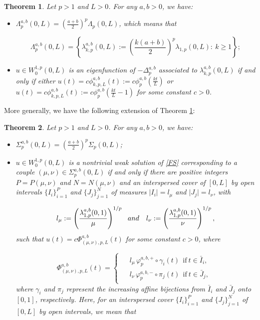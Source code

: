 \documentclass[a4paper,11pt]{article}
\newtheorem{teor}{Theorem}[section]
\begin{document}
{\begin{teor} \label{T2}
Let $p > 1$ and $L > 0$. For any $a, b > 0$, we have:

\begin{itemize}
\item[(I)] $\Lambda^{a,b}_p(0,L) = \displaystyle \left( \frac{a + b}{2} \right)^p \Lambda_p(0,L)$, which means that

\[
\Lambda^{a,b}_p(0,L) = \left\{\lambda^{a,b}_{k,p}(0,L) := \left( \frac{k(a + b)}{2} \right)^p \lambda_{1,p}(0,L):\ k \geq 1 \right\};
\]
\item[(II)] $u \in W_0^{1,p}(0,L)$ is an eigenfunction of $-\Delta^{a,b}_p$ associated to $\lambda^{a,b}_{k,p}(0,L)$ if and only if either $u(t) = c \phi_{k,p,L}^{a,b}(t) := c\phi_{p}^{a,b}\left(\frac{kt}{L}\right)$ or $u(t) = c \phi_{k,p,L}^{a,b}(t) := c\phi_{p}^{a,b}\left(\frac{kt}{L}-1\right)$ for some constant $c > 0$.
\end{itemize}
\end{teor}

More generally, we have the following extension of Theorem \ref{T2}:

\begin{teor} \label{T3}
Let $p > 1$ and $L > 0$. For any $a, b > 0$, we have:

\begin{itemize}
\item[(I)] $\Sigma^{a,b}_p(0,L) = \displaystyle \left( \frac{a + b}{2} \right)^p \Sigma_p(0,L)$;

\item[(II)] $u \in W_0^{1,p}(0,L)$ is a nontrivial weak solution of \eqref{FS} corresponding to a couple $(\mu, \nu) \in \Sigma^{a,b}_p(0,L)$ if and only if there are positive integers $P = P(\mu, \nu)$ and $N = N(\mu, \nu)$ and an interspersed cover of $[0,L]$ by open intervals $\{I_i\}^P_{i=1}$ and $\{J_j\}^N_{j=1}$ of measures $\vert I_i \vert = l_\mu$ and $\vert J_j \vert = l_\nu$, with

\[
l_\mu := \left( \frac{\lambda^{a,b}_{1,p}(0,1)}{\mu} \right)^{1/p}\ \ {\rm and}\ \ \ l_\nu := \left( \frac{\lambda^{a,b}_{1,p}(0,1)}{\nu} \right)^{1/p},
\]
such that $u(t) = c\Phi_{(\mu, \nu), p, L}^{a,b}\left( t \right)$ for some constant $c>0$, where

\begin{equation*}
\Phi_{(\mu, \nu), p, L}^{a,b}\left( t \right) =
\begin{cases}
\begin{aligned}
     & l_\mu\, \varphi_{p}^{a,b,+} \circ \gamma_i(t)\ \ \text{if} \ t \in \bar{I}_i, \\
     & l_\nu\,  \varphi_{p}^{a,b,-} \circ \pi_j(t)\ \ \text{if} \ t \in \bar{J}_j,
\end{aligned}
\end{cases}
\end{equation*}
where $\gamma_i$ and $\pi_j$ represent the increasing affine bijections from $\bar{I}_i$ and $\bar{J}_j$ onto $[0,1]$, respectively. Here, for an interspersed cover $\{I_i\}^P_{i=1}$ and $\{J_j\}^N_{j=1}$ of $[0,L]$ by open intervals, we mean that


\end{itemize}
\end{teor}}
\end{document}
